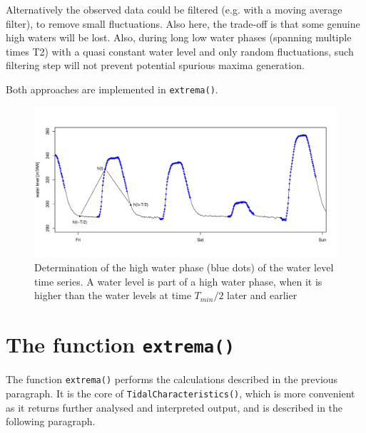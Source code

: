 \documentclass[10pt,a4wide]{article}
\begin{document}
Alternatively the observed data could be filtered (e.g. with a moving average filter), to remove small fluctuations. Also here, the trade-off is that some genuine high waters will be lost. Also, during long low water phases  (spanning multiple times T2) with a quasi constant water level and only random fluctuations, such filtering step will not prevent potential spurious maxima generation. 

Both approaches are implemented in \texttt{extrema()}.

\begin{figure}[h]
\begin{center}
\includegraphics[width=\textwidth]{./TideFig2}
\end{center}
\caption{Determination of the high water phase (blue dots) of the water level time series. A water level is part of a high water phase, when it is higher than the water levels at time $T_{min}/2$ later and earlier} 
\label{Fig2}
\end{figure}




\section{The function \texttt{extrema()}}
The function \texttt{extrema()} performs the calculations described in the previous paragraph. It is the core of \texttt{TidalCharacteristics()}, which is more convenient as it returns further analysed and interpreted output, and is described in the following paragraph. 
\end{document}

